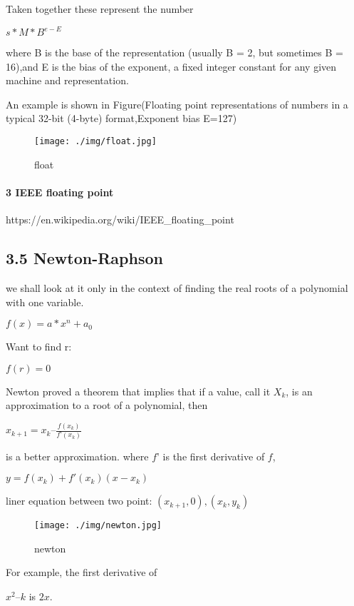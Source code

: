 \documentclass[11pt]{article}
\makeatletter
\def\maxwidth{\ifdim\Gin@nat@width>\linewidth\linewidth
    \else\Gin@nat@width\fi}
\let\Oldincludegraphics\includegraphics
\renewcommand{\includegraphics}[1]{\Oldincludegraphics[width=.8\maxwidth]{#1}}
\makeatother
\begin{document}
Taken together these represent the number

\(s*M* B^{e−E}\)

where B is the base of the representation (usually B = 2, but sometimes
B = 16),and E is the bias of the exponent, a fixed integer constant for
any given machine and representation.

An example is shown in Figure(Floating point representations of numbers
in a typical 32-bit (4-byte) format,Exponent bias E=127)

\begin{figure}
\centering
\texttt{[image: ./img/float.jpg]}
\caption{float}
\end{figure}

\hypertarget{ieee-floating-point}{%
\paragraph{3 IEEE floating point}\label{ieee-floating-point}}

https://en.wikipedia.org/wiki/IEEE\_floating\_point

    \hypertarget{newton-raphson}{%
\subsection{3.5 Newton-Raphson}\label{newton-raphson}}

we shall look at it only in the context of finding the real roots of a
polynomial with one variable.

\(f(x)=a*x^n +a_0\)

Want to find r:

\(f(r)=0\)

Newton proved a theorem that implies that if a value, call it \(X_k\),
is an approximation to a root of a polynomial, then

\(x_{k+1}=x_k– \frac{f(x_k)}{f’(x_k)}\)

is a better approximation. where \(f’\) is the first derivative of
\(f\),

\(y=f(x_k)+f'(x_k)(x-x_k)\)

liner equation between two point: \((x_{k+1},0),(x_k,y_k)\)

\begin{figure}
\centering
\texttt{[image: ./img/newton.jpg]}
\caption{newton}
\end{figure}

For example, the first derivative of

\(x^2 – k\) is \(2x\).
\end{document}
